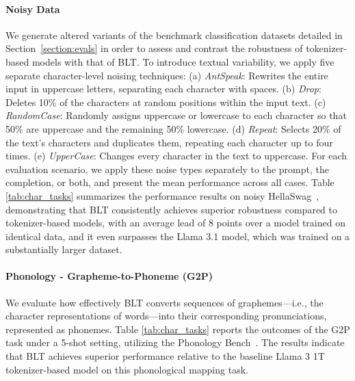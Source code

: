 \paragraph{Noisy Data} We generate altered variants of the benchmark classification datasets detailed in Section~\ref{section:evals} in order to assess and contrast the robustness of tokenizer-based models with that of {\textsc BLT}. To introduce textual variability, we apply five separate character-level noising techniques: (a) \textit{AntSpeak}: Rewrites the entire input in uppercase letters, separating each character with spaces. (b) \textit{Drop}: Deletes 10\% of the characters at random positions within the input text. (c) \textit{RandomCase}: Randomly assigns uppercase or lowercase to each character so that 50\% are uppercase and the remaining 50\% lowercase. (d) \textit{Repeat}: Selects 20\% of the text's characters and duplicates them, repeating each character up to four times. (e) \textit{UpperCase}: Changes every character in the text to uppercase. For each evaluation scenario, we apply these noise types separately to the prompt, the completion, or both, and present the mean performance across all cases. Table \ref{tab:char_tasks} summarizes the performance results on noisy HellaSwag~\citep{Eval_hellaswag}, demonstrating that {\textsc BLT} consistently achieves superior robustness compared to tokenizer-based models, with an average lead of 8 points over a model trained on identical data, and it even surpasses the Llama 3.1 model, which was trained on a substantially larger dataset.

\paragraph{Phonology - Grapheme-to-Phoneme (G2P)} We evaluate how effectively {\textsc BLT} converts sequences of graphemes—i.e., the character representations of words—into their corresponding pronunciations, represented as phonemes. Table \ref{tab:char_tasks} reports the outcomes of the G2P task under a 5-shot setting, utilizing the Phonology Bench~\citep{suvarna2024phonologybench}. The results indicate that {\textsc BLT} achieves superior performance relative to the baseline Llama 3 1T tokenizer-based model on this phonological mapping task.

